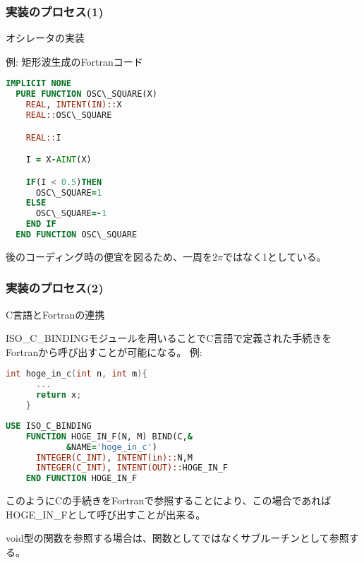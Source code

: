 \documentclass[dvipdfmx]{beamer} %
\begin{document}
\begin{frame}[fragile]
  \frametitle{実装のプロセス(1)}
  \alert{オシレータの実装}
  
  例: 矩形波生成のFortranコード
  \begin{lstlisting}[language={Fortran}]
  IMPLICIT NONE
  PURE FUNCTION OSC\_SQUARE(X)
    REAL, INTENT(IN)::X
    REAL::OSC\_SQUARE

    REAL::I

    I = X-AINT(X)

    IF(I < 0.5)THEN
      OSC\_SQUARE=1
    ELSE
      OSC\_SQUARE=-1
    END IF
  END FUNCTION OSC\_SQUARE 
  \end{lstlisting}
  
  \vspace{0.5em}
  後のコーディング時の便宜を図るため、一周を$2\pi$ではなく1としている。
\end{frame}

\begin{frame}[fragile]
  \frametitle{実装のプロセス(2)}
  \alert{C言語とFortranの連携}\par
  ISO\_C\_BINDINGモジュールを用いることでC言語で定義された手続きをFortranから呼び出すことが可能になる。
  例:\par
  \begin{lstlisting}[language={C}]
    int hoge_in_c(int n, int m){
      ...
      return x;
    }
  \end{lstlisting}
  \begin{lstlisting}[language={Fortran}]
    USE ISO_C_BINDING
    FUNCTION HOGE_IN_F(N, M) BIND(C,&
            &NAME='hoge_in_c')
      INTEGER(C_INT), INTENT(in)::N,M
      INTEGER(C_INT), INTENT(OUT)::HOGE_IN_F
    END FUNCTION HOGE_IN_F
  \end{lstlisting}  
  このようにCの手続きをFortranで参照することにより、この場合であればHOGE\_IN\_Fとして呼び出すことが出来る。\par
  void型の関数を参照する場合は、関数としてではなくサブルーチンとして参照する。
  \end{frame}
\end{document}

